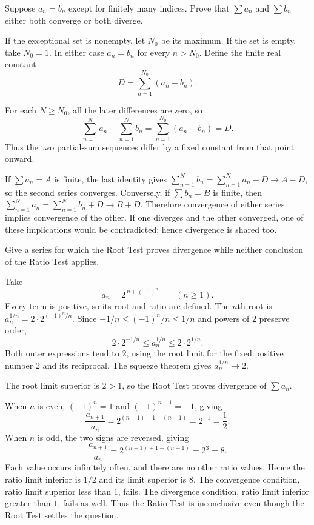 \goal Suppose $a_n=b_n$ except for finitely many indices. Prove
that $\sum a_n$ and $\sum b_n$ either both converge or both
diverge.

If the exceptional set is nonempty, let $N_0$ be its maximum.
If the set is empty, take $N_0=1$. In either case $a_n=b_n$
for every $n>N_0$. Define the finite real constant
\[
 D=\sum_{n=1}^{N_0}(a_n-b_n).
\]

For each $N\ge N_0$, all the later differences are zero, so
\[
 \sum_{n=1}^{N}a_n-\sum_{n=1}^{N}b_n
 =\sum_{n=1}^{N_0}(a_n-b_n)=D.
\]
Thus the two partial-sum sequences differ by a fixed constant
from that point onward.

If $\sum a_n=A$ is finite, the last identity gives
$\sum_{n=1}^{N}b_n=\sum_{n=1}^{N}a_n-D\to A-D$, so the
second series converges. Conversely, if $\sum b_n=B$ is finite,
then $\sum_{n=1}^{N}a_n=\sum_{n=1}^{N}b_n+D\to B+D$.
Therefore convergence of either series implies convergence of the
other. If one diverges and the other converged, one of these
implications would be contradicted; hence divergence is shared too.

\goal Give a series for which the Root Test proves divergence
while neither conclusion of the Ratio Test applies.

Take
\[
 a_n=2^{\,n+(-1)^n}\qquad(n\ge1).
\]
Every term is positive, so its root and ratio are defined.
The $n$th root is $a_n^{1/n}=2\cdot2^{(-1)^n/n}$.
Since $-1/n\le(-1)^n/n\le1/n$ and powers of $2$ preserve
order,
\[
 2\cdot2^{-1/n}\le a_n^{1/n}\le2\cdot2^{1/n}.
\]
Both outer expressions tend to $2$, using the root limit for the
fixed positive number $2$ and its reciprocal. The squeeze theorem
gives $a_n^{1/n}\to2$.

The root limit superior is $2>1$, so the Root Test proves
divergence of $\sum a_n$.

When $n$ is even, $(-1)^n=1$ and $(-1)^{n+1}=-1$, giving
\[
 \frac{a_{n+1}}{a_n}
 =2^{(n+1)-1-(n+1)}=2^{-1}=\frac12.
\]
When $n$ is odd, the two signs are reversed, giving
\[
 \frac{a_{n+1}}{a_n}
 =2^{(n+1)+1-(n-1)}=2^3=8.
\]
Each value occurs infinitely often, and there are no other ratio
values. Hence the ratio limit inferior is $1/2$ and its limit
superior is $8$. The convergence condition, ratio limit superior
less than $1$, fails. The divergence condition, ratio limit
inferior greater than $1$, fails as well. Thus the Ratio Test is
inconclusive even though the Root Test settles the question.

